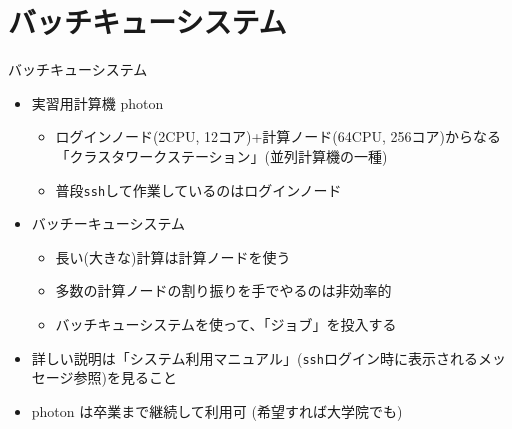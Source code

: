 \section{バッチキューシステム}

\begin{frame}[t,fragile]{バッチキューシステム}
  \begin{itemize}
    \setlength{\itemsep}{1em}
  \item 実習用計算機 photon
    \begin{itemize}
    \item ログインノード(2CPU, 12コア)+計算ノード(64CPU, 256コア)からなる「クラスタワークステーション」(並列計算機の一種)
    \item 普段{\tt ssh}して作業しているのはログインノード
    \end{itemize}
  \item バッチーキューシステム
    \begin{itemize}
    \item 長い(大きな)計算は計算ノードを使う
    \item 多数の計算ノードの割り振りを手でやるのは非効率的
    \item バッチキューシステムを使って、「ジョブ」を投入する
    \end{itemize}
  \item 詳しい説明は「システム利用マニュアル」({\tt ssh}ログイン時に表示されるメッセージ参照)を見ること
  \item photon は卒業まで継続して利用可 (希望すれば大学院でも)
  \end{itemize}
\end{frame}
